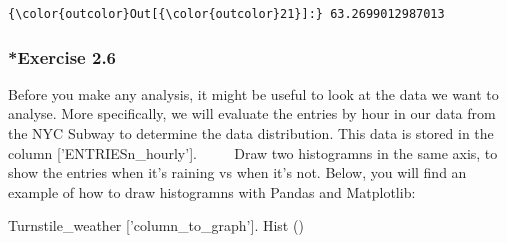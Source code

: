 \documentclass[11pt]{article}
\newenvironment{Shaded}{}{}
\newcommand{\StringTok}[1]{\textcolor[rgb]{0.25,0.44,0.63}{{#1}}}
\newcommand{\NormalTok}[1]{{#1}}
\begin{document}
\begin{Verbatim}[commandchars=\\\{\}]
{\color{outcolor}Out[{\color{outcolor}21}]:} 63.2699012987013
\end{Verbatim}
            
    \subsubsection{*Exercise 2.6}\label{exercise-2.6}

Before you make any analysis, it might be useful to look at the data we
want to analyse. More specifically, we will evaluate the entries by hour
in our data from the NYC Subway to determine the data distribution. This
data is stored in the column {[}'ENTRIESn\_hourly'{]}. ~~~~ Draw two
histogramns in the same axis, to show the entries when it's raining vs
when it's not. Below, you will find an example of how to draw
histogramns with Pandas and Matplotlib: ~~~~

\begin{Shaded}
\begin{Highlighting}[]
\NormalTok{Turnstile_weather [}\StringTok{'column_to_graph'}\NormalTok{]. Hist ()}
\end{Highlighting}
\end{Shaded}
\end{document}
